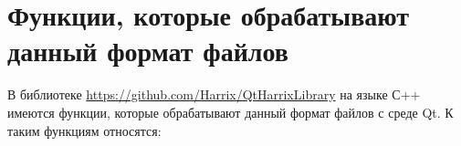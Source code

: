 \documentclass[a4paper,12pt]{article}
\begin{document}
\section{Функции, которые обрабатывают данный формат файлов}

В библиотеке \href {https://github.com/Harrix/QtHarrixLibrary} {https://github.com/Harrix/QtHarrixLibrary} на языке С++ имеются функции, которые обрабатывают данный формат файлов с среде Qt. К таким функциям относятся:
\end{document}
